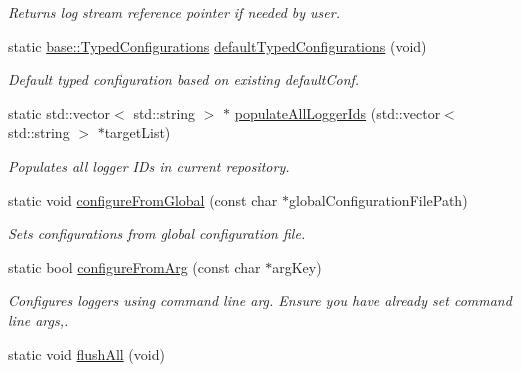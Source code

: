 \begin{DoxyCompactItemize}
\begin{DoxyCompactList}\small\item\em Returns log stream reference pointer if needed by user. \end{DoxyCompactList}\item 
\hypertarget{classel_1_1Loggers_af296007c3eb3b71602ec80ff59875b46}{static \hyperlink{classel_1_1base_1_1TypedConfigurations}{base\-::\-Typed\-Configurations} \hyperlink{classel_1_1Loggers_af296007c3eb3b71602ec80ff59875b46}{default\-Typed\-Configurations} (void)}\label{classel_1_1Loggers_af296007c3eb3b71602ec80ff59875b46}

\begin{DoxyCompactList}\small\item\em Default typed configuration based on existing default\-Conf. \end{DoxyCompactList}\item 
static std\-::vector$<$ std\-::string $>$ $\ast$ \hyperlink{classel_1_1Loggers_adea07ec6cbc1dfc50f939d69dcac7160}{populate\-All\-Logger\-Ids} (std\-::vector$<$ std\-::string $>$ $\ast$target\-List)
\begin{DoxyCompactList}\small\item\em Populates all logger I\-Ds in current repository. \end{DoxyCompactList}\item 
\hypertarget{classel_1_1Loggers_a9992995a85745639aa9aa5a2df2255f5}{static void \hyperlink{classel_1_1Loggers_a9992995a85745639aa9aa5a2df2255f5}{configure\-From\-Global} (const char $\ast$global\-Configuration\-File\-Path)}\label{classel_1_1Loggers_a9992995a85745639aa9aa5a2df2255f5}

\begin{DoxyCompactList}\small\item\em Sets configurations from global configuration file. \end{DoxyCompactList}\item 
static bool \hyperlink{classel_1_1Loggers_a28acf6f2b1ea7e5edd1b2560cde82406}{configure\-From\-Arg} (const char $\ast$arg\-Key)
\begin{DoxyCompactList}\small\item\em Configures loggers using command line arg. Ensure you have already set command line args,. \end{DoxyCompactList}\item 
\hypertarget{classel_1_1Loggers_a1834480e970c16817459ca3ee26b44b5}{static void \hyperlink{classel_1_1Loggers_a1834480e970c16817459ca3ee26b44b5}{flush\-All} (void)}\label{classel_1_1Loggers_a1834480e970c16817459ca3ee26b44b5}


\end{DoxyCompactItemize}
